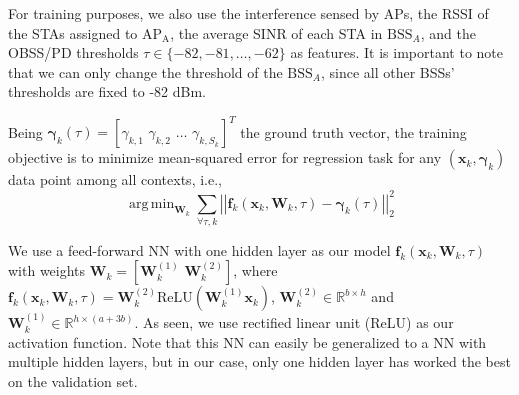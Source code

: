 \documentclass[10pt,a4paper,twocolumn]{article}
\DeclareMathOperator*{\argmin}{arg\,min}
\renewcommand{\vec}[1]{\boldsymbol{#1}}
\newcommand{\norm}[1]{\left|\left|#1\right|\right|}
\newcommand{\ITUpar}{\vspace{8pt}\par}
\begin{document}
For training purposes, we also use the interference sensed by APs, the RSSI of the STAs assigned to $\mathrm{AP}_\mathrm{A}$, the average SINR of each STA in $\mathrm{BSS}_A$, and the OBSS/PD thresholds $\tau \in \{-82, -81, \ldots, -62\}$ as features. It is important to note that we can only change the threshold of the $\mathrm{BSS}_A$, since all other BSSs' thresholds are fixed to -82 dBm.\ITUpar



Being $\vec{\gamma}_{k}(\tau) = \left[ \gamma_{k,1} \, \, \gamma_{k,2} \, \,  \ldots \, \, \gamma_{k, S_k} \right]^T$ the ground truth vector, the training objective is to minimize mean-squared error for regression task for any $(\vec{x}_{k}, \vec{\gamma}_{k})$ data point among all contexts, i.e.,
\begin{equation*}
	\argmin_{\vec{W}_k} \sum_{\forall \tau,k}  \norm{\vec{f}_{k}(\vec{x}_{k}, \vec{W}_k, \tau) - \vec{\gamma}_{k}(\tau)}_2^2
\end{equation*}

We use a feed-forward NN with one hidden layer as our model $\vec{f}_{k} (\vec{x}_{k}, \vec{W}_k, \tau)$ with weights $\vec{W}_k = \left[  \vec{W}_k^{(1)} \, \, \vec{W}_k^{(2)} \right]$, where $\vec{f}_k (\vec{x}_k, \vec{W}_k, \tau) = \vec{W}_k^{(2)} \mathrm{ReLU} ( \vec{W}_k^{(1)}\vec{x}_k) $, $\vec{W}_k^{(2)} \in \mathbb{R}^{b \times h}$ and  $\vec{W}_k^{(1)} \in \mathbb{R}^{h \times (a+3b)}$. As seen, we use rectified linear unit (ReLU) as our activation function. Note that this NN can easily be generalized to a NN with multiple hidden layers, but in our case, only one hidden layer has worked the best on the validation set.\ITUpar

\end{document}
